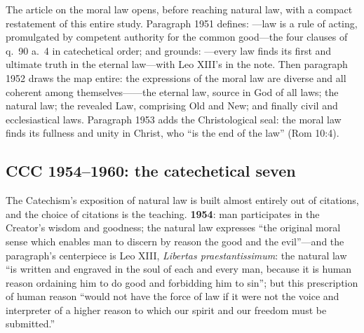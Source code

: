 The article on the moral law opens, before reaching natural law, with a compact restatement of this entire study. Paragraph 1951 defines: ---law is a rule of acting, promulgated by competent authority for the common good---the four clauses of q.~90 a.~4 in catechetical order; and grounds: ---every law finds its first and ultimate truth in the eternal law---with Leo XIII's  in the note. Then paragraph 1952 draws the map entire: the expressions of the moral law are diverse and all coherent among themselves------the eternal law, source in God of all laws; the natural law; the revealed Law, comprising Old and New; and finally civil and ecclesiastical laws. Paragraph 1953 adds the Christological seal: the moral law finds its fullness and unity in Christ, who ``is the end of the law'' (Rom 10:4).

\subsection{CCC 1954--1960: the catechetical seven}

The Catechism's exposition of natural law is built almost entirely out of citations, and the choice of citations is the teaching. \textbf{1954}: man participates in the Creator's wisdom and goodness; the natural law expresses ``the original moral sense which enables man to discern by reason the good and the evil''---and the paragraph's centerpiece is Leo XIII, \emph{Libertas praestantissimum}: the natural law ``is written and engraved in the soul of each and every man, because it is human reason ordaining him to do good and forbidding him to sin''; but this prescription of human reason ``would not have the force of law if it were not the voice and interpreter of a higher reason to which our spirit and our freedom must be submitted.''

